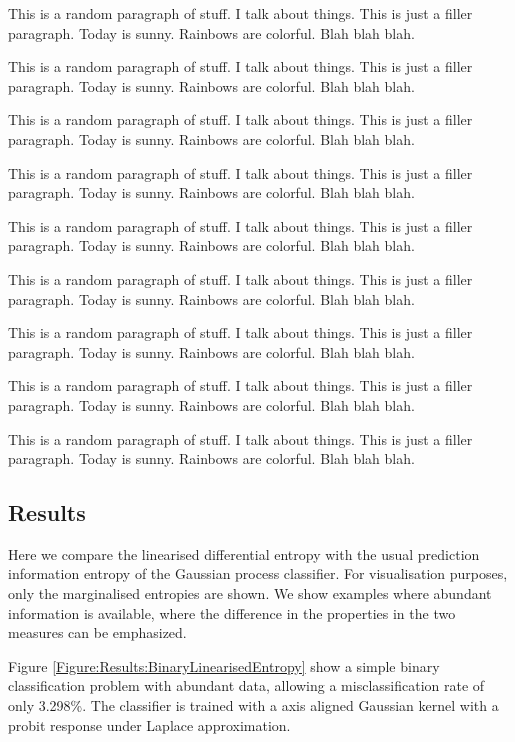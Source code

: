 \documentclass{article}
\begin{document}
		{\color{BurntOrange} This is a random paragraph of stuff. I talk about things. This is just a filler paragraph. Today is sunny. Rainbows are colorful. Blah blah blah.}
		
		{\color{BurntOrange} This is a random paragraph of stuff. I talk about things. This is just a filler paragraph. Today is sunny. Rainbows are colorful. Blah blah blah.}
		
		{\color{BurntOrange} This is a random paragraph of stuff. I talk about things. This is just a filler paragraph. Today is sunny. Rainbows are colorful. Blah blah blah.}
		
		{\color{BurntOrange} This is a random paragraph of stuff. I talk about things. This is just a filler paragraph. Today is sunny. Rainbows are colorful. Blah blah blah.}
		
		{\color{BurntOrange} This is a random paragraph of stuff. I talk about things. This is just a filler paragraph. Today is sunny. Rainbows are colorful. Blah blah blah.}
		
		{\color{BurntOrange} This is a random paragraph of stuff. I talk about things. This is just a filler paragraph. Today is sunny. Rainbows are colorful. Blah blah blah.}
		
		{\color{BurntOrange} This is a random paragraph of stuff. I talk about things. This is just a filler paragraph. Today is sunny. Rainbows are colorful. Blah blah blah.}
		
		{\color{BurntOrange} This is a random paragraph of stuff. I talk about things. This is just a filler paragraph. Today is sunny. Rainbows are colorful. Blah blah blah.}
		
		{\color{BurntOrange} This is a random paragraph of stuff. I talk about things. This is just a filler paragraph. Today is sunny. Rainbows are colorful. Blah blah blah.}
		
	\subsection{Results}
		
		Here we compare the linearised differential entropy with the usual prediction information entropy of the Gaussian process classifier. For visualisation purposes, only the marginalised entropies are shown. We show examples where abundant information is available, where the difference in the properties in the two measures can be emphasized. 
		
		Figure \ref{Figure:Results:BinaryLinearisedEntropy} show a simple binary classification problem with abundant data, allowing a misclassification rate of only 3.298\%. The classifier is trained with a axis aligned Gaussian kernel with a probit response under Laplace approximation.
		
\end{document}
